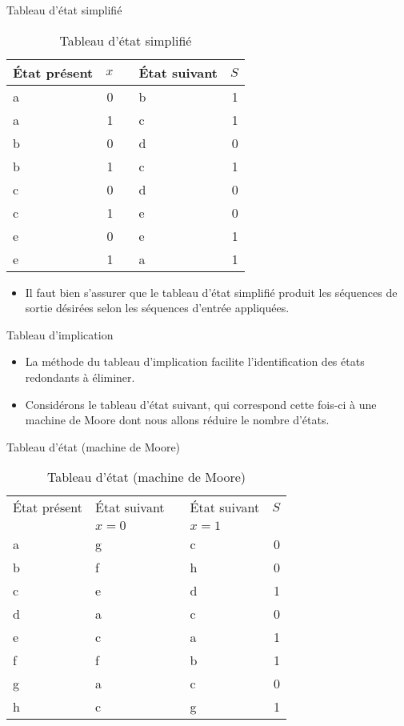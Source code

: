 \documentclass[presentation]{beamer}
\begin{document}
\begin{frame}[label={sec:org081ea4d}]{Tableau d'état simplifié}
\begin{table}[htbp]
\caption{\label{tab:org7340712}Tableau d'état simplifié}
\centering
\begin{tabular}{lrllr}
État présent & \(x\) &  & État suivant & \(S\)\\
\hline
a & 0 &  & b & 1\\
a & 1 &  & c & 1\\
b & 0 &  & d & 0\\
b & 1 &  & c & 1\\
c & 0 &  & d & 0\\
c & 1 &  & e & 0\\
e & 0 &  & e & 1\\
e & 1 &  & a & 1\\
\end{tabular}
\end{table}

\begin{itemize}
\item Il faut bien s'assurer que le tableau d'état simplifié produit les séquences de sortie désirées selon les séquences d'entrée appliquées.
\end{itemize}
\end{frame}

\begin{frame}[label={sec:org4ad1d3f}]{Tableau d'implication}
\begin{itemize}
\item La méthode du tableau d'implication facilite l'identification des états redondants à éliminer.

\item Considérons le tableau d'état suivant, qui correspond cette fois-ci à une machine de Moore dont nous allons réduire le nombre d'états.
\end{itemize}
\end{frame}

\begin{frame}[label={sec:orgcf0b650}]{Tableau d'état (machine de Moore)}
\begin{table}[htbp]
\caption{\label{tab:org5801f79}Tableau d'état (machine de Moore)}
\centering
\begin{tabular}{llllr}
État présent & État suivant &  & État suivant & \(S\)\\
 & \(x=0\) &  & \(x=1\) & \\
\hline
a & g &  & c & 0\\
b & f &  & h & 0\\
c & e &  & d & 1\\
d & a &  & c & 0\\
e & c &  & a & 1\\
f & f &  & b & 1\\
g & a &  & c & 0\\
h & c &  & g & 1\\
\end{tabular}
\end{table}
\end{frame}
\end{document}
